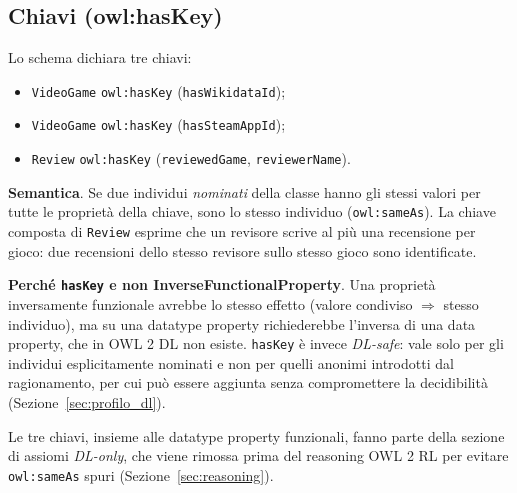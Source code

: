 \subsection{Chiavi (owl:hasKey)}
\label{sec:haskey}

Lo schema dichiara tre chiavi:
\begin{itemize}[nosep]
  \item \texttt{VideoGame} \texttt{owl:hasKey} (\texttt{hasWikidataId});
  \item \texttt{VideoGame} \texttt{owl:hasKey} (\texttt{hasSteamAppId});
  \item \texttt{Review} \texttt{owl:hasKey} (\texttt{reviewedGame}, \texttt{reviewerName}).
\end{itemize}

\textbf{Semantica}. Se due individui \emph{nominati} della classe hanno gli stessi
valori per tutte le propriet\`a della chiave, sono lo stesso individuo
(\texttt{owl:sameAs}). La chiave composta di \texttt{Review} esprime che un revisore
scrive al pi\`u una recensione per gioco: due recensioni dello stesso revisore sullo
stesso gioco sono identificate.

\textbf{Perch\'e \texttt{hasKey} e non InverseFunctionalProperty}. Una propriet\`a
inversamente funzionale avrebbe lo stesso effetto (valore condiviso $\Rightarrow$
stesso individuo), ma su una datatype property richiederebbe l'inversa di una data
property, che in OWL 2 DL non esiste. \texttt{hasKey} \`e invece \emph{DL-safe}: vale
solo per gli individui esplicitamente nominati e non per quelli anonimi introdotti dal
ragionamento, per cui pu\`o essere aggiunta senza compromettere la decidibilit\`a
(Sezione~\ref{sec:profilo_dl}).

Le tre chiavi, insieme alle datatype property funzionali, fanno parte della sezione
di assiomi \emph{DL-only}, che viene rimossa prima del reasoning OWL 2 RL per evitare
\texttt{owl:sameAs} spuri (Sezione~\ref{sec:reasoning}).

